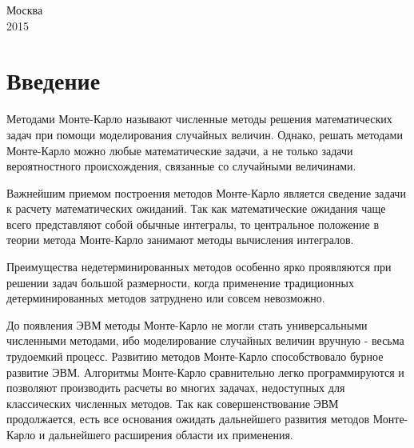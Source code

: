 \documentclass[a4paper,12pt]{article}
\begin{document}
\begin{titlepage}

\vspace{120px}
{\large Москва\\2015}\\[2cm] %

\vfill %

\end{titlepage}



\tableofcontents

\newpage
\section{Введение}

Методами Монте-Карло называют численные методы решения математических задач при помощи моделирования случайных величин. Однако, решать методами Монте-Карло можно любые математические задачи, а не только задачи вероятностного происхождения, связанные со случайными величинами.

Важнейшим приемом построения методов Монте-Карло является сведение задачи к расчету математических ожиданий. Так как математические ожидания чаще всего представляют собой обычные интегралы, то центральное положение в теории метода Монте-Карло занимают методы вычисления интегралов.

Преимущества недетерминированных методов особенно ярко проявляются при решении задач большой размерности, когда применение традиционных детерминированных методов затруднено или совсем невозможно.

До появления ЭВМ методы Монте-Карло не могли стать универсальными численными методами, ибо моделирование случайных величин вручную - весьма трудоемкий процесс. Развитию методов Монте-Карло способствовало бурное развитие ЭВМ. Алгоритмы Монте-Карло сравнительно легко программируются и позволяют производить расчеты во многих задачах, недоступных для классических численных методов. Так как совершенствование ЭВМ продолжается, есть все основания ожидать дальнейшего развития методов Монте-Карло и дальнейшего расширения области их применения.
\end{document}

